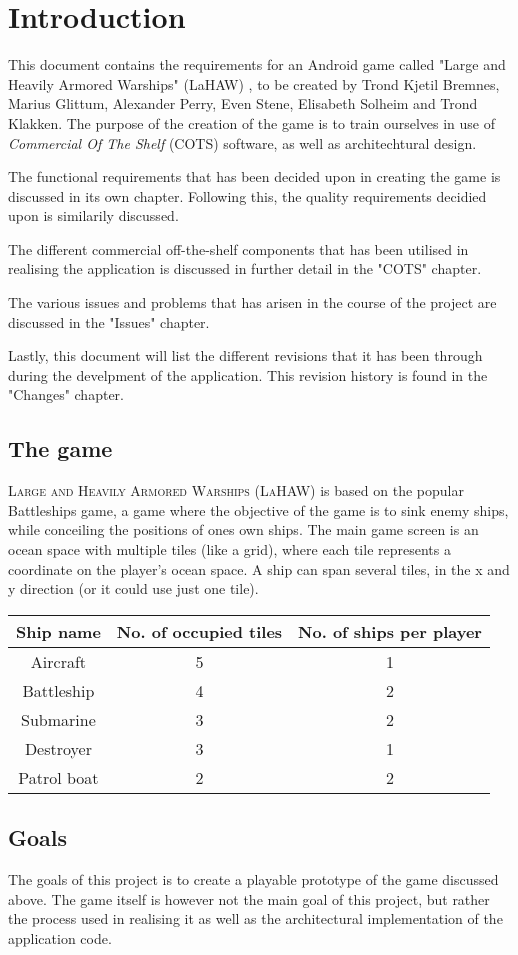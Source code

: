 \chapter{Introduction}
This document contains the requirements for an Android game called "Large and Heavily Armored Warships" (LaHAW) , to be created by Trond Kjetil Bremnes, Marius Glittum, Alexander Perry, Even Stene, Elisabeth Solheim and Trond Klakken. The purpose of the creation of the game is to train ourselves in use of \emph{Commercial Of The Shelf} (COTS) software, as well as architechtural design.

The functional requirements that has been decided upon in creating the game is discussed in its own chapter. Following this, the quality requirements decidied upon is similarily discussed.

The different commercial off-the-shelf components that has been utilised in realising the application is discussed in further detail in the "COTS" chapter.

The various issues and problems that has arisen in the course of the project are discussed in the "Issues" chapter.

Lastly, this document will list the different revisions that it has been through during the develpment of the application. This revision history is found in the "Changes" chapter.



\section{The game}
\textsc{Large and Heavily Armored Warships (LaHAW)} is based on the popular Battleships\cite{battleship} game, a game where the objective of the game is to sink enemy ships, while conceiling the positions of ones own ships. The main game screen is an ocean space with multiple tiles (like a grid), where each tile represents a coordinate on the player's ocean space. A ship can span several tiles, in the x and y direction (or it could use just one tile). 
\\


\begin{tabular}{| c | c | c |}
    \hline
    \rowcolor[gray]{0.8}
    \hspace{0.3cm}\textbf{Ship name}\hspace{0.3cm} & \textbf{No. of occupied tiles} & \textbf{No. of ships per player} \\
    \hline
    Aircraft & 5 & 1 \\
    Battleship & 4 & 2 \\
    Submarine & 3 & 2 \\
    Destroyer & 3 & 1 \\
    Patrol boat & 2 & 2 \\
    \hline
\end{tabular}
\label{shiptable}





\section{Goals}
The goals of this project is to create a playable prototype of the game discussed above. The game itself is however not the main goal of this project, but rather the process used in realising it as well as the architectural implementation of the application code.
